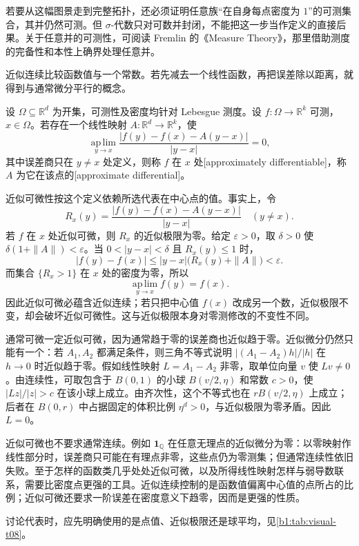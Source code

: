 \ProseParagraphBreak

若要从这幅图景走到完整拓扑，还必须证明任意族“在自身每点密度为 \(1\)”的可测集合，其并仍然可测。但 \(\sigma\)-代数只对可数并封闭，不能把这一步当作定义的直接后果。关于任意并的可测性，可阅读 Fremlin 的《Measure Theory》\cite[414P]{Fremlin2016Measure}，那里借助测度的完备性和本性上确界处理任意并。



近似连续比较函数值与一个常数。若先减去一个线性函数，再把误差除以距离，就得到与通常微分平行的概念。

\begin{definition}
\label{b1:def:approximate-differential}
设 \(\Omega\subseteq\mathbb R^d\) 为开集，可测性及密度均针对 Lebesgue 测度。设 \(f:\Omega\rightarrow\mathbb R^k\) 可测，\(x\in\Omega\)。若存在一个线性映射 \(A:\mathbb R^d\rightarrow\mathbb R^k\)，使
\[
\operatorname*{ap\,lim}_{y\to x}
\frac{|f(y)-f(x)-A(y-x)|}{|y-x|}=0,
\]
其中误差商只在 \(y\ne x\) 处定义，则称 \(f\) 在 \(x\) 处[approximately differentiable]，称 \(A\) 为它在该点的[approximate differential]。
\end{definition}

近似可微性按这个定义依赖所选代表在中心点的值。事实上，令
\[
 R_x(y)=\frac{|f(y)-f(x)-A(y-x)|}{|y-x|}\quad(y\ne x).
\]
若 \(f\) 在 \(x\) 处近似可微，则 \(R_x\) 的近似极限为零。给定 \(\varepsilon>0\)，取 \(\delta>0\) 使 \(\delta(1+\|A\|)<\varepsilon\)。当 \(0<|y-x|<\delta\) 且 \(R_x(y)\leq1\) 时，
\[
 |f(y)-f(x)|
 \leq |y-x|\bigl(R_x(y)+\|A\|\bigr)<\varepsilon.
\]
而集合 \(\{R_x>1\}\) 在 \(x\) 处的密度为零，所以
\[
 \operatorname*{ap\,lim}_{y\to x}f(y)=f(x).
\]
因此近似可微必蕴含近似连续；若只把中心值 \(f(x)\) 改成另一个数，近似极限不变，却会破坏近似可微性。这与近似极限本身对零测修改的不变性不同。

\ProseParagraphBreak

通常可微一定近似可微，因为通常趋于零的误差商也近似趋于零。近似微分仍然只能有一个：若 \(A_1,A_2\) 都满足条件，则三角不等式说明 \(|(A_1-A_2)h|/|h|\) 在 \(h\to0\) 时近似趋于零。假如线性映射 \(L=A_1-A_2\) 非零，取单位向量 \(v\) 使 \(Lv\ne0\)。由连续性，可取包含于 \(B(0,1)\) 的小球 \(B(v/2,\eta)\) 和常数 \(c>0\)，使 \(|Lz|/|z|>c\) 在该小球上成立。由齐次性，这个不等式也在 \(rB(v/2,\eta)\) 上成立；后者在 \(B(0,r)\) 中占据固定的体积比例 \(\eta^d>0\)，与近似极限为零矛盾。因此 \(L=0\)。

\ProseParagraphBreak

近似可微也不要求通常连续。例如 \(\mathbf1_{\mathbb Q}\) 在任意无理点的近似微分为零：以零映射作线性部分时，误差商只可能在有理点非零，这些点仍为零测集；但通常连续性依旧失败。至于怎样的函数类几乎处处近似可微，以及所得线性映射怎样与弱导数联系，需要比密度点更强的工具。近似连续控制的是函数值偏离中心值的点所占的比例；近似可微还要求一阶误差在密度意义下趋零，因而是更强的性质。

讨论代表时，应先明确使用的是点值、近似极限还是球平均，见\cref{b1:tab:visual-t08}。

